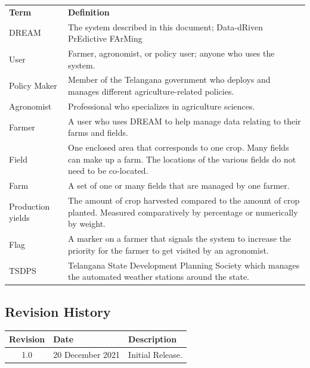 
\begin{center}
\renewcommand{\arraystretch}{1.25}
\begin{tabular}{l >{\raggedright\arraybackslash}p{12cm} } \hline
    \textbf{Term} & \textbf{Definition}\\ 
    DREAM & The system described in this document; Data-dRiven PrEdictive FArMing\\
    User & Farmer, agronomist, or policy user; anyone who uses the system.\\
	Policy Maker & Member of the Telangana government who deploys and manages different agriculture-related policies. \\
	Agronomist & Professional who specializes in agriculture sciences. \\
    Farmer & A user who uses DREAM to help manage data relating to their farms and fields.\\
    Field & One enclosed area that corresponds to one crop. Many fields can make up a farm. The locations of the various fields do not need to be co-located.\\
    Farm & A set of one or many fields that are managed by one farmer.\\
    Production yields & The amount of crop harvested compared to the amount of crop planted. Measured comparatively by percentage or numerically by weight.\\
    Flag & A marker on a farmer that signals the system to increase the priority for the farmer to get visited by an agronomist.\\
    TSDPS & Telangana State Development Planning Society which manages the automated weather stations around the state. \\
    \hline
\end{tabular}
\end{center}

\subsection{Revision History}


\begin{flushleft}
\renewcommand{\arraystretch}{1.25}
\begin{tabular}{|c| l|>{\raggedright\arraybackslash}p{12cm} |} \hline
    \textbf{Revision} & \textbf{Date} & \textbf{Description}\\ \hline 
    1.0 & 20 December 2021 & Initial Release.\\
    \hline
\end{tabular}
\end{flushleft}


